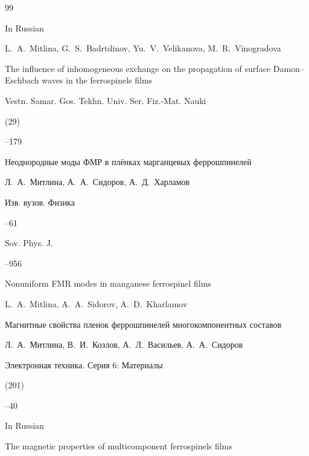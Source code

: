 \begin{thebibliography}{99}
\misctransl

\lang In Russian

\by L.~A.~Mitlina, G.~S.~Badrtdinov, Yu.~V.~Velikanova, M.~R.~Vinogradova

\paper The influence of inhomogeneous exchange on the propagation of surface Damon--Eschbach waves in the ferrospinels films

\jour Vestn. Samar. Gos. Tekhn. Univ. Ser. Fiz.-Mat. Nauki


(29)

--179








\paper Неоднородные моды ФМР в плёнках  марганцевых феррошпинелей 

\by Л.~А.~Митлина, А.~А.~Сидоров, А.~Д.~Харламов

 \jour Изв. вузов. Физика



--61

\transl 

\jour Sov. Phys. J.




--956

\paper Nonuniform FMR modes in manganese ferrospinel films

\by L.~A.~Mitlina, A.~A.~Sidorov, A.~D.~Kharlamov 





\paper Магнитные свойства пленок феррошпинелей многокомпонентных составов 

\by Л.~А.~Митлина, В.~И.~Козлов, А.~Л.~Васильев, А.~А.~Сидоров

\jour Электронная техника. Серия 6: Материалы


 (201)

--40

\misctransl

\lang In Russian

\paper The magnetic properties of multicomponent  ferrospinels films


\end{thebibliography}

